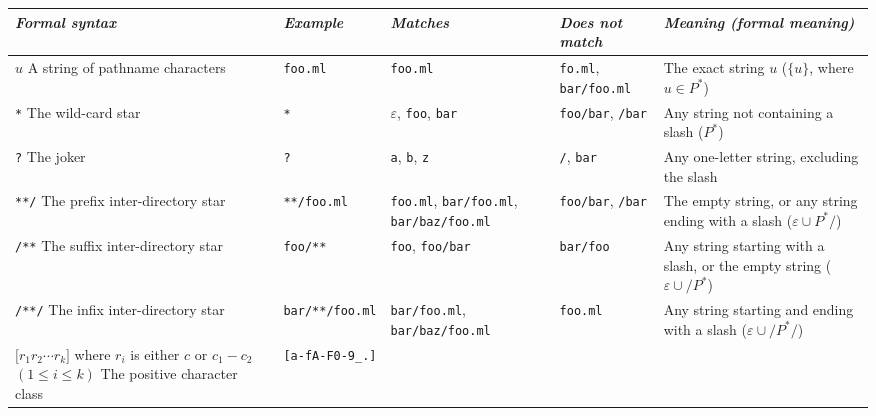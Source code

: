 \documentclass[9pt]{article}
\begin{document}
\begin{table}[h]
  \begin{center}
    \small
    \begin{tabular}{|p{3cm}|l|p{3cm}|p{3cm}|p{5cm}|}
    \hline
    {\em Formal syntax} &
    {\em Example} & {\em Matches} & {\em Does not match} &
    {\em Meaning (formal meaning)} \\
    \hline
    \hline
    {$u$ \vspace*{0.5em} A string of pathname characters} &
    \texttt{foo.ml} &
    \texttt{foo.ml} &
    \texttt{fo.ml}, \texttt{bar/foo.ml} &
    The exact string $u$
    ($\{ u \}$, where $u \in P^*$) \\
    \hline
    {\texttt{*} \vspace*{0.5em} The wild-card star}&
    \texttt{*}&
    $\varepsilon$, \texttt{foo}, \texttt{bar} &
    \texttt{foo/bar}, \texttt{/bar} &
    Any string not containing a slash
    ($P^*$) \\
    \hline
    {\texttt{?} \vspace*{0.5em} The joker}&
    \texttt{?}&
    \texttt{a}, \texttt{b}, \texttt{z} &
    \texttt{/}, \texttt{bar} &
    Any one-letter string, excluding the slash \\
    \hline
    {\texttt{**/} \vspace*{0.5em} The prefix inter-directory star}&
    \texttt{**/foo.ml}&
    \texttt{foo.ml}, \texttt{bar/foo.ml}, \texttt{bar/baz/foo.ml} &
    \texttt{foo/bar}, \texttt{/bar} &
    The empty string, or any string ending with a slash
    ($\varepsilon \cup P^*\mathtt{/}$) \\
    \hline
    {\texttt{/**} \vspace*{0.5em} The suffix inter-directory star}&
    \texttt{foo/**}&
    \texttt{foo}, \texttt{foo/bar} &
    \texttt{bar/foo} &
    Any string starting with a slash, or the empty string
    ($\varepsilon \cup \mathtt{/}P^*$) \\
    \hline
    {\texttt{/**/} \vspace*{0.5em} The infix inter-directory star}&
    \texttt{bar/**/foo.ml}&
    \texttt{bar/foo.ml}, \texttt{bar/baz/foo.ml} &
    \texttt{foo.ml} &
    Any string starting and ending with a slash
    ($\varepsilon \cup \mathtt{/}P^*\mathtt{/}$) \\
    \hline
    {$\mathtt{[} r_1 r_2 \cdots r_k \mathtt{]}$
    where $r_i$ is either $c$ or $c_1-c_2$ $(1 \leq i \leq k)$
    \vspace*{0.5em} The positive character class}&
    \texttt{[a-fA-F0-9\_.]}&

\end{tabular}
\end{center}
\end{table}
\end{document}
